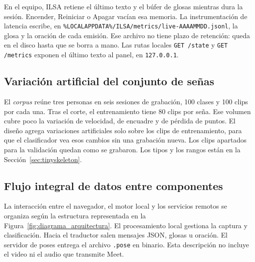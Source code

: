 En el equipo, ILSA retiene el último texto y el búfer de glosas mientras dura la sesión. Encender, Reiniciar o Apagar vacían esa memoria. La instrumentación de latencia escribe, en \texttt{\%LOCALAPPDATA\%/ILSA/metrics/live-AAAAMMDD.jsonl}, la glosa y la oración de cada emisión. Ese archivo no tiene plazo de retención: queda en el disco hasta que se borra a mano. Las rutas locales \texttt{GET /state} y \texttt{GET /metrics} exponen el último texto al panel, en \texttt{127.0.0.1}.

\subsection{Variación artificial del conjunto de señas}
El \textit{corpus} reúne tres personas en seis sesiones de grabación, 100 clases y 100 clips por cada una. Tras el corte, el entrenamiento tiene 80 clips por seña. Ese volumen cubre poco la variación de velocidad, de encuadre y de pérdida de puntos. El diseño agrega variaciones artificiales solo sobre los clips de entrenamiento, para que el clasificador vea esos cambios sin una grabación nueva. Los clips apartados para la validación quedan como se grabaron. Los tipos y los rangos están en la Sección~\ref{sec:tinyskeleton}.

\subsection{Flujo integral de datos entre componentes}
La interacción entre el navegador, el motor local y los servicios remotos se organiza según la estructura representada en la Figura~\ref{fig:diagrama_arquitectura}. El procesamiento local gestiona la captura y clasificación. Hacia el traductor salen mensajes JSON, glosas u oración. El servidor de poses entrega el archivo \texttt{.pose} en binario. Esta descripción no incluye el video ni el audio que transmite Meet.  %

